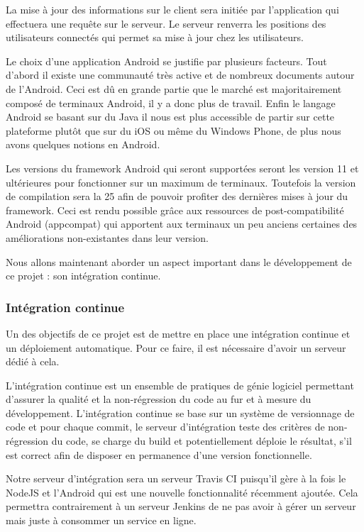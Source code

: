 La mise à jour des informations sur le client sera initiée par l’application qui effectuera une requête sur le serveur. Le serveur renverra les positions des utilisateurs connectés qui permet sa mise à jour chez les utilisateurs.

Le choix d'une application Android se justifie par plusieurs facteurs. Tout d’abord il existe une communauté très active et de nombreux documents autour de l’Android. Ceci est dû en grande partie que le marché est majoritairement composé de terminaux Android, il y a donc plus de travail. Enfin le langage Android se basant sur du Java il nous est plus accessible de partir sur cette plateforme plutôt que sur du iOS ou même du Windows Phone, de plus nous avons quelques notions en Android.

Les versions du framework Android qui seront supportées seront les version 11 et ultérieures pour fonctionner sur un maximum de terminaux. Toutefois la version de compilation sera la 25 afin de pouvoir profiter des dernières mises à jour du framework. Ceci est rendu possible grâce aux ressources de post-compatibilité Android (appcompat) qui apportent aux terminaux un peu anciens certaines des améliorations non-existantes dans leur version.

Nous allons maintenant aborder un aspect important dans le développement de ce projet : son intégration continue.

\subsubsection{Intégration continue}

Un des objectifs de ce projet est de mettre en place une intégration continue et un déploiement automatique. Pour ce faire, il est nécessaire d'avoir un serveur dédié à cela. 

L’intégration continue est un ensemble de pratiques de génie logiciel permettant d’assurer la qualité et la non-régression du code au fur et à mesure du développement. L’intégration continue se base sur un système de versionnage de code et pour chaque commit, le serveur d’intégration teste des critères de non-régression du code, se charge du build et potentiellement déploie le résultat, s’il est correct afin de disposer en permanence d’une version fonctionnelle.

Notre serveur d'intégration sera un serveur Travis CI puisqu'il gère à la fois le NodeJS et l'Android qui est une nouvelle fonctionnalité récemment ajoutée. Cela permettra contrairement à un serveur Jenkins de ne pas avoir à gérer un serveur mais juste à consommer un service en ligne.

